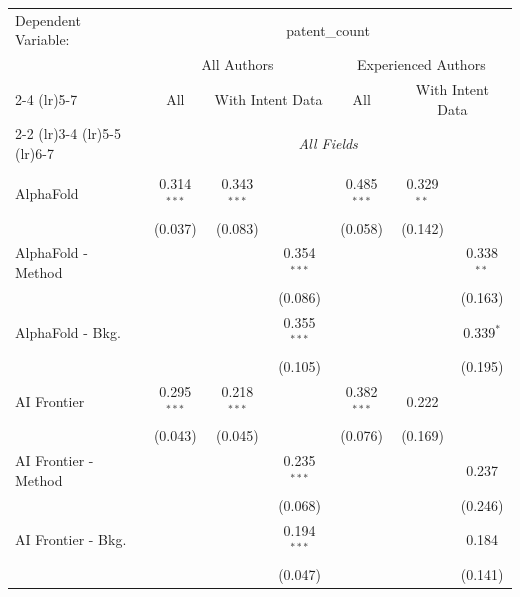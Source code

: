 \begingroup
\centering
\begin{tabular}{lcccccc}
   \tabularnewline \midrule \midrule
   Dependent Variable: & \multicolumn{6}{c}{patent\_count}\\
 & \multicolumn{3}{c}{All Authors} & \multicolumn{3}{c}{Experienced Authors} \\
\cmidrule(lr){2-4} \cmidrule(lr){5-7}
 & \multicolumn{1}{c}{All} & \multicolumn{2}{c}{With Intent Data} & \multicolumn{1}{c}{All} & \multicolumn{2}{c}{With Intent Data} \\
\cmidrule(lr){2-2} \cmidrule(lr){3-4} \cmidrule(lr){5-5} \cmidrule(lr){6-7}
 & \multicolumn{6}{c}{\textit{All Fields}} \\ \\
   AlphaFold            & 0.314$^{***}$ & 0.343$^{***}$ &               & 0.485$^{***}$ & 0.329$^{**}$  &   \\   
                        & (0.037)       & (0.083)       &               & (0.058)       & (0.142)       &   \\   
   AlphaFold - Method   &               &               & 0.354$^{***}$ &               &               & 0.338$^{**}$\\   
                        &               &               & (0.086)       &               &               & (0.163)\\   
   AlphaFold - Bkg.     &               &               & 0.355$^{***}$ &               &               & 0.339$^{*}$\\   
                        &               &               & (0.105)       &               &               & (0.195)\\   
   AI Frontier          & 0.295$^{***}$ & 0.218$^{***}$ &               & 0.382$^{***}$ & 0.222         &   \\   
                        & (0.043)       & (0.045)       &               & (0.076)       & (0.169)       &   \\   
   AI Frontier - Method &               &               & 0.235$^{***}$ &               &               & 0.237\\   
                        &               &               & (0.068)       &               &               & (0.246)\\   
   AI Frontier - Bkg.   &               &               & 0.194$^{***}$ &               &               & 0.184\\   
                        &               &               & (0.047)       &               &               & (0.141)\\   

\end{tabular}
